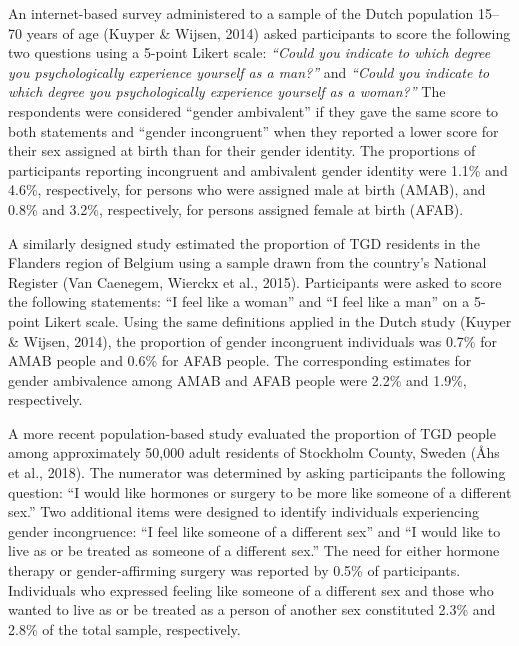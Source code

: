 \documentclass[
]{book}
\begin{document}
An internet-based survey administered to a
sample of the Dutch population 15--70 years of
age (Kuyper \& Wijsen, 2014) asked participants
to score the following two questions using a
5-point Likert scale: \emph{``Could you indicate to which
degree you psychologically experience yourself as
a man?''} and \emph{``Could you indicate to which degree
you psychologically experience yourself as a
woman?''} The respondents were considered ``gender ambivalent'' if they gave the same score to
both statements and ``gender incongruent'' when
they reported a lower score for their sex assigned
at birth than for their gender identity. The proportions of participants reporting incongruent
and ambivalent gender identity were 1.1\% and
4.6\%, respectively, for persons who were assigned
male at birth (AMAB), and 0.8\% and 3.2\%,
respectively, for persons assigned female at
birth (AFAB).

A similarly designed study estimated the proportion of TGD residents in the Flanders region
of Belgium using a sample drawn from the country's National Register (Van Caenegem, Wierckx
et al., 2015). Participants were asked to score the
following statements: ``I feel like a woman'' and
``I feel like a man'' on a 5-point Likert scale. Using
the same definitions applied in the Dutch study
(Kuyper \& Wijsen, 2014), the proportion of gender incongruent individuals was 0.7\% for AMAB
people and 0.6\% for AFAB people. The corresponding estimates for gender ambivalence among
AMAB and AFAB people were 2.2\% and 1.9\%,
respectively.

A more recent population-based study evaluated the proportion of TGD people among
approximately 50,000 adult residents of Stockholm
County, Sweden (Åhs et al., 2018). The numerator
was determined by asking participants the following question: ``I would like hormones or surgery to be more like someone of a different sex.''
Two additional items were designed to identify
individuals experiencing gender incongruence: ``I
feel like someone of a different sex'' and ``I would
like to live as or be treated as someone of a different sex.'' The need for either hormone therapy
or gender-affirming surgery was reported by 0.5\%
of participants. Individuals who expressed feeling
like someone of a different sex and those who
wanted to live as or be treated as a person of
another sex constituted 2.3\% and 2.8\% of the
total sample, respectively.
\end{document}
